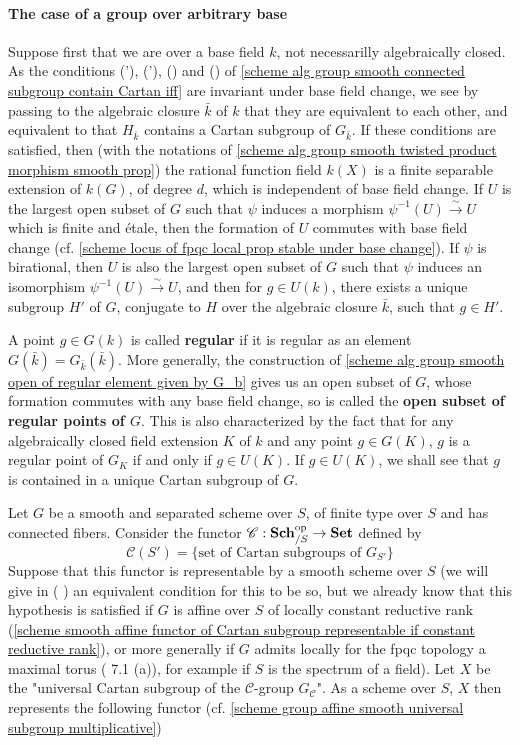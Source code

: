 \paragraph{The case of a group over arbitrary base}
Suppose first that we are over a base field $k$, not necessarilly algebraically closed. As the conditions ('), ('), () and () of \cref{scheme alg group smooth connected subgroup contain Cartan iff} are invariant under base field change, we see by passing to the algebraic closure $\bar{k}$ of $k$ that they are equivalent to each other, and equivalent to that $H_{\bar{k}}$ contains a Cartan subgroup of $G_{\bar{k}}$. If these conditions are satisfied, then (with the notations of \cref{scheme alg group smooth twisted product morphism smooth prop}) the rational function field $k(X)$ is a finite separable extension of $k(G)$, of degree $d$, which is independent of base field change. If $U$ is the largest open subset of $G$ such that $\psi$ induces a morphism $\psi^{-1}(U)\stackrel{\sim}{\to}U$ which is finite and \'etale, then the formation of $U$ commutes with base field change (cf. \cref{scheme locus of fpqc local prop stable under base change}). If $\psi$ is birational, then $U$ is also the largest open subset of $G$ such that $\psi$ induces an isomorphism $\psi^{-1}(U)\stackrel{\sim}{\to}U$, and then for $g\in U(k)$, there exists a unique subgroup $H'$ of $G$, conjugate to $H$ over the algebraic closure $\bar{k}$, such that $g\in H'$.\par
A point $g\in G(k)$ is called \textbf{regular} if it is regular as an element $G(\bar{k})=G_{\bar{k}}(\bar{k})$. More generally, the construction of \cref{scheme alg group smooth open of regular element given by G_b} gives us an open subset of $G$, whose formation commutes with any base field change, so is called the \textbf{open subset of regular points of $G$}. This is also characterized by the fact that for any algebraically closed field extension $K$ of $k$ and any point $g\in G(K)$, $g$ is a regular point of $G_K$ if and only if $g\in U(K)$. If $g\in U(K)$, we shall see that $g$ is contained in a unique Cartan subgroup of $G$.\par
Let $G$ be a smooth and separated scheme over $S$, of finite type over $S$ and has connected fibers. Consider the functor $\mathscr{C}:\mathbf{Sch}_{/S}^{\mathrm{op}}\to\mathbf{Set}$ defined by
\[\mathscr{C}(S')=\{\text{set of Cartan subgroups of $G_{S'}$}\}\]
Suppose that this functor is representable by a smooth scheme over $S$ (we will give in (\cite{SGA3-2} ) an equivalent condition for this to be so, but we already know that this hypothesis is satisfied if $G$ is affine over $S$ of locally constant reductive rank (\cref{scheme smooth affine functor of Cartan subgroup representable if constant reductive rank}), or more generally if $G$ admits locally for the fpqc topology a maximal torus (\cite{SGA3-2} 7.1 (a)), for example if $S$ is the spectrum of a field). Let $X$ be the "universal Cartan subgroup of the $\mathscr{C}$-group $G_{\mathscr{C}}$". As a scheme over $S$, $X$ then represents the following functor (cf. \cref{scheme group affine smooth universal subgroup multiplicative})
